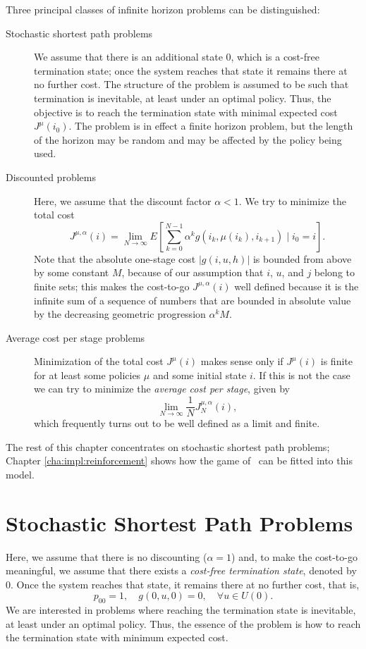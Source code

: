 Three principal classes of infinite horizon problems can be distinguished: 
\begin{description}
\item[Stochastic shortest path problems]
We assume that there is an additional state 0, which is a cost-free termination state; once the system reaches that state it remains there at no further cost. The structure of the problem is assumed to be such that termination is inevitable, at least under an optimal policy. Thus, the objective is to reach the termination state with minimal expected cost $J^\mu(i_0)$. The problem is in effect a finite horizon problem, but the length of the horizon may be random and may be affected by the policy being used.

\item[Discounted problems]
Here, we assume that the discount factor $\alpha < 1$. We try to minimize the total cost 
$$J^{\mu,\alpha}(i) = \lim_{N \rightarrow \infty} E \left [\sum^{N-1}_{k=0}\alpha^k g(i_k,\mu(i_k),i_{k+1}) \mid i_0=i \right ].$$ Note that the absolute one-stage cost $|g(i,u,h)|$ is bounded from above by some constant $M$, because of our assumption that $i$, $u$, and $j$ belong to finite sets; this makes the cost-to-go $J^{\mu,\alpha}(i)$ well defined because it is the infinite sum of a sequence of numbers that are bounded in absolute value by the decreasing geometric progression $\alpha^k M$.

\item[Average cost per stage problems]
Minimization of the total cost $J^\mu(i)$ makes sense only if $J^\mu(i)$ is finite for at least some policies $\mu$ and some initial state $i$. If this is not the case we can try to minimize the \emph{average cost per stage}, given by
$$\lim_{N \rightarrow \infty} \frac{1}{N}J^{\mu,\alpha}_N(i),$$ which frequently turns out to be well defined as a limit and finite.
\end{description}

The rest of this chapter concentrates on stochastic shortest path problems; Chapter \ref{cha:impl:reinforcement} shows how the game of \Abalone\ can be fitted into this model.








\section{Stochastic Shortest Path Problems} \label{sec:stochastic} 
Here, we assume that there is no discounting ($\alpha = 1$) and, to make the cost-to-go meaningful, we assume that there exists a \emph{cost-free termination state}, denoted by 0. Once the system reaches that state, it remains there at no further cost, that is,
$$p_{00} = 1, \quad g(0,u,0) = 0, \quad \forall u \in U(0).$$
We are interested in problems where reaching the termination state is inevitable, at least under an optimal policy. Thus, the essence of the problem is how to reach the termination state with minimum expected cost.


